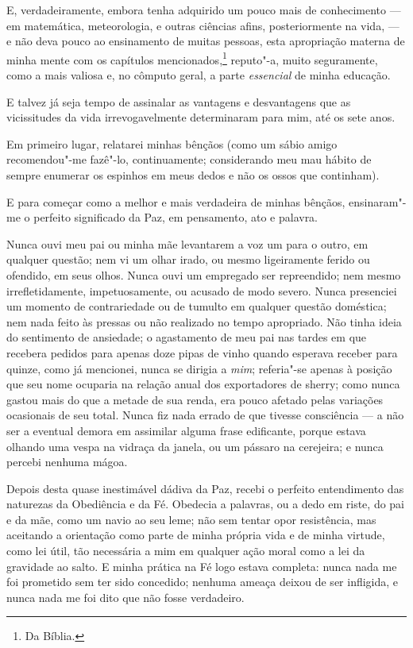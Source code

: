\medskip

\noindent{}E, verdadeiramente, embora tenha adquirido um pouco mais de conhecimento
--- em matemática, meteorologia, e outras ciências afins, posteriormente
na vida, --- e não deva pouco ao ensinamento de muitas pessoas, esta
apropriação materna de minha mente com os capítulos mencionados,\footnote{Da
Bíblia.} reputo"-a, muito seguramente, como a mais valiosa e, no
cômputo geral, a parte \textit{essencial} de minha educação.

E talvez já seja tempo de assinalar as vantagens e desvantagens que as
vicissitudes da vida irrevogavelmente determinaram para mim, até os sete
anos.

Em primeiro lugar, relatarei minhas bênçãos (como um sábio amigo
recomendou"-me fazê"-lo, continuamente; considerando meu mau hábito de
sempre enumerar os espinhos em meus dedos e não os ossos que continham).

E para começar como a melhor e mais verdadeira de minhas bênçãos,
ensinaram"-me o perfeito significado da Paz, em pensamento, ato e
palavra.

Nunca ouvi meu pai ou minha mãe levantarem a voz um para o outro, em
qualquer questão; nem vi um olhar irado, ou mesmo ligeiramente ferido ou
ofendido, em seus olhos. Nunca ouvi um empregado ser repreendido; nem
mesmo irrefletidamente, impetuosamente, ou acusado de modo severo. Nunca
presenciei um momento de contrariedade ou de tumulto em qualquer questão
doméstica; nem nada feito às pressas ou não realizado no tempo
apropriado. Não tinha ideia do sentimento de ansiedade; o agastamento de
meu pai nas tardes em que recebera pedidos para apenas doze pipas de
vinho quando esperava receber para quinze, como já mencionei, nunca se
dirigia a \textit{mim}; referia"-se apenas à posição que seu nome ocuparia
na relação anual dos exportadores de sherry; como nunca gastou mais do
que a metade de sua renda, era pouco afetado pelas variações ocasionais
de seu total. Nunca fiz nada errado de que tivesse consciência --- a não
ser a eventual demora em assimilar alguma frase edificante, porque
estava olhando uma vespa na vidraça da janela, ou um pássaro na
cerejeira; e nunca percebi nenhuma mágoa.

Depois desta quase inestimável dádiva da Paz, recebi o perfeito
entendimento das naturezas da Obediência e da Fé. Obedecia a palavras,
ou a dedo em riste, do pai e da mãe, como um navio ao seu leme; não sem
tentar opor resistência, mas aceitando a orientação como parte de minha
própria vida e de minha virtude, como lei útil, tão necessária a mim em
qualquer ação moral como a lei da gravidade ao salto. E minha prática na
Fé logo estava completa: nunca nada me foi prometido sem ter sido
concedido; nenhuma ameaça deixou de ser infligida, e nunca nada me foi
dito que não fosse verdadeiro.

